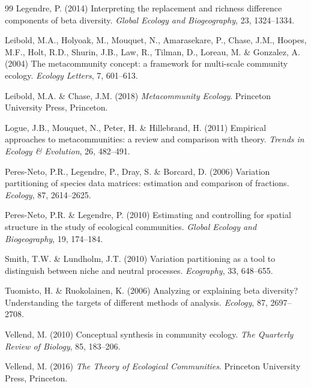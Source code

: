 \documentclass[11pt,a4paper]{article}
\begin{document}
\begin{thebibliography}{99}
 Legendre, P. (2014) Interpreting the replacement
and richness difference components of beta diversity. \textit{Global Ecology and
Biogeography}, 23, 1324--1334.

 Leibold, M.A., Holyoak, M., Mouquet, N.,
Amarasekare, P., Chase, J.M., Hoopes, M.F., Holt, R.D., Shurin, J.B., Law, R., Tilman, D.,
Loreau, M. \& Gonzalez, A. (2004) The metacommunity concept: a framework for multi-scale
community ecology. \textit{Ecology Letters}, 7, 601--613.

 Leibold, M.A. \& Chase, J.M. (2018)
\textit{Metacommunity Ecology}. Princeton University Press, Princeton.

 Logue, J.B., Mouquet, N., Peter, H. \&
Hillebrand, H. (2011) Empirical approaches to metacommunities: a review and comparison
with theory. \textit{Trends in Ecology \& Evolution}, 26, 482--491.

 Peres-Neto, P.R., Legendre, P., Dray, S.
\& Borcard, D. (2006) Variation partitioning of species data matrices: estimation and
comparison of fractions. \textit{Ecology}, 87, 2614--2625.

 Peres-Neto, P.R. \& Legendre, P.
(2010) Estimating and controlling for spatial structure in the study of ecological
communities. \textit{Global Ecology and Biogeography}, 19, 174--184.

 Smith, T.W. \& Lundholm, J.T. (2010)
Variation partitioning as a tool to distinguish between niche and neutral processes.
\textit{Ecography}, 33, 648--655.

 Tuomisto, H. \& Ruokolainen, K.
(2006) Analyzing or explaining beta diversity? Understanding the targets of different
methods of analysis. \textit{Ecology}, 87, 2697--2708.

 Vellend, M. (2010) Conceptual synthesis in community
ecology. \textit{The Quarterly Review of Biology}, 85, 183--206.

 Vellend, M. (2016) \textit{The Theory of Ecological
Communities}. Princeton University Press, Princeton.

\end{thebibliography}
\end{document}
